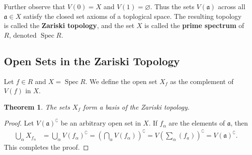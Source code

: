 \documentclass[11pt]{article}
\newtheorem{theorem}{Theorem}
\newcommand{\Spec}{\operatorname{Spec}}
\begin{document}
Further observe that $V(0) = X$ and $V(1) = \varnothing$. Thus the sets $V(\mathfrak{a})$ across all $\mathfrak{a} \in X$ satisfy the closed set axioms of a toplogical space. The resulting topology is called the \textbf{Zariski topology}, and the set $X$ is called the \textbf{prime spectrum} of $R$, denoted $\Spec R$.


\subsection{Open Sets in the Zariski Topology}

Let $f \in R$ and $X = \Spec R$. We define the open set $X_{f}$ as the complement of $V(f)$ in $X$.

\begin{adjustwidth}{0.5cm}{}
  \begin{theorem}
    The sets $X_{f}$ form a basis of the Zariski topology.
  \end{theorem}
  \begin{proof}
    Let $V(\mathfrak{a})^{\complement}$ be an arbitrary open set in $X$. If $f_{\alpha}$ are the elements of $\mathfrak{a}$, then
    \begin{align*}
      \bigcup\limits_{\alpha} X_{f_{\alpha}} &= \bigcup\limits_{\alpha} V(f_{\alpha})^{\complement} = \left( \bigcap\limits_{\alpha} V(f_{\alpha}) \right)^{\complement} = V \left( \sum\limits_{\alpha} (f_{a})  \right)^{\complement} = V(\mathfrak{a})^{\complement}.
    \end{align*}
    This completes the proof.
  \end{proof} 
\end{adjustwidth}
\end{document}
